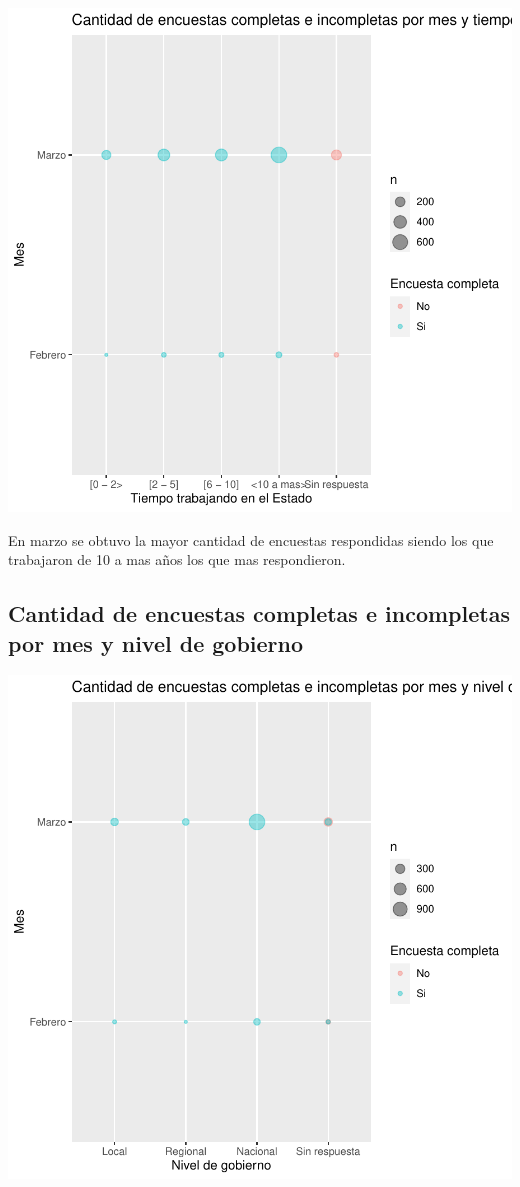 \documentclass{article}
\begin{document}
\includegraphics{seguimientov3-058}

En marzo se obtuvo la mayor cantidad de encuestas respondidas siendo los que trabajaron de 10 a mas años los que mas respondieron.

\subsection{Cantidad de encuestas completas e incompletas por mes y nivel de gobierno}

\includegraphics{seguimientov3-059}
\end{document}
